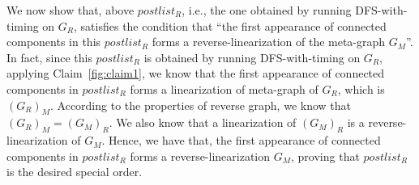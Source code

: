 \begin{algorithmblock}[0.8\textwidth]
	\xxx
	\xxx
	\xxx
	\xxx
\end{algorithmblock}

We now show that, above $postlist_R$, i.e., the one obtained by running DFS-with-timing on $G_R$,
satisfies the condition that ``the first appearance of connected components in 
this $postlist_R$ forms a reverse-linearization of the meta-graph $G_M$''.
In fact,  since this $postlist_R$ is obtained by running DFS-with-timing on $G_R$,
applying Claim~\ref{fig:claim1},
we know that the first appearance of connected components in $postlist_R$ forms a linearization of meta-graph of $G_R$,
which is $(G_R)_M$.
According to the properties of reverse graph, we know that $(G_R)_M = (G_M)_R$.
We also know that a linearization of $(G_M)_R$ is a reverse-linearization of $G_M$.
Hence, we have that, 
the first appearance of connected components in $postlist_R$ forms a reverse-linearization $G_M$, proving
that $postlist_R$ is the desired special order.
